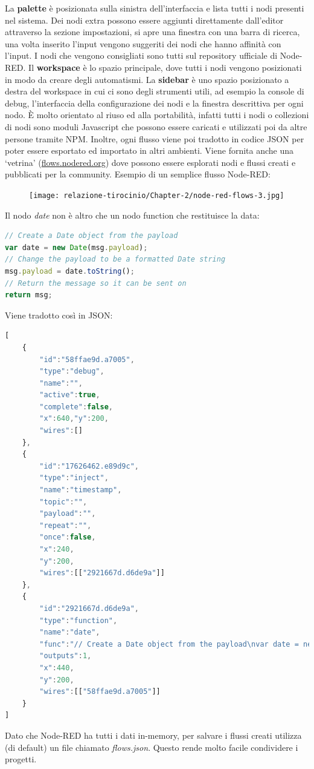 \documentclass[a4paper,10pt]{memoir}
\begin{document}
La \textbf{palette} è posizionata sulla sinistra dell'interfaccia e lista tutti i nodi presenti nel sistema. Dei nodi extra possono essere aggiunti direttamente dall'editor attraverso la sezione impostazioni, si apre una finestra con una barra di ricerca, una volta inserito l'input vengono suggeriti dei nodi che hanno affinità con l'input.
I nodi che vengono consigliati sono tutti sul repository ufficiale di Node-RED.
Il \textbf{workspace} è lo spazio principale, dove tutti i nodi vengono posizionati in modo da creare degli automatismi.
La \textbf{sidebar} è uno spazio posizionato a destra del workspace in cui ci sono degli strumenti utili, ad esempio la console di debug, l'interfaccia della configurazione dei nodi e la finestra descrittiva per ogni nodo.
È molto orientato al riuso ed alla portabilità, infatti tutti i nodi o collezioni di nodi sono moduli Javascript che possono essere caricati e utilizzati poi da altre persone tramite NPM.
Inoltre, ogni flusso viene poi tradotto in codice JSON per poter essere esportato ed importato in altri ambienti.
Viene fornita anche una `vetrina' (\href{https://flows.nodered.org}{flows.nodered.org}) dove possono essere esplorati nodi e flussi creati e pubblicati per la community.
Esempio di un semplice flusso Node-RED:
\begin{figure}[H]
\texttt{[image: relazione-tirocinio/Chapter-2/node-red-flows-3.jpg]}
\end{figure}
Il nodo \textit{date} non è altro che un nodo function che restituisce la data:
\begin{lstlisting}[language=JavaScript]
// Create a Date object from the payload
var date = new Date(msg.payload);
// Change the payload to be a formatted Date string
msg.payload = date.toString();
// Return the message so it can be sent on
return msg;
\end{lstlisting}
Viene tradotto così in JSON:
\begin{lstlisting}[language=JavaScript]
[
    {
        "id":"58ffae9d.a7005",
        "type":"debug",
        "name":"",
        "active":true,
        "complete":false,
        "x":640,"y":200,
        "wires":[]
    },
    {
        "id":"17626462.e89d9c",
        "type":"inject",
        "name":"timestamp",
        "topic":"",
        "payload":"",
        "repeat":"",
        "once":false,
        "x":240,
        "y":200,
        "wires":[["2921667d.d6de9a"]]
    },
    {
        "id":"2921667d.d6de9a",
        "type":"function",
        "name":"date",
        "func":"// Create a Date object from the payload\nvar date = new Date(msg.payload);\n// Change the payload to be a formatted Date string\nmsg.payload = date.toString();\n// Return the message so it can be sent on\nreturn msg;",
        "outputs":1,
        "x":440,
        "y":200,
        "wires":[["58ffae9d.a7005"]]
    }
]
\end{lstlisting}
Dato che Node-RED ha tutti i dati in-memory, per salvare i flussi creati utilizza (di default) un file chiamato \textit{flows.json}. Questo rende molto facile condividere i progetti.
\end{document}
